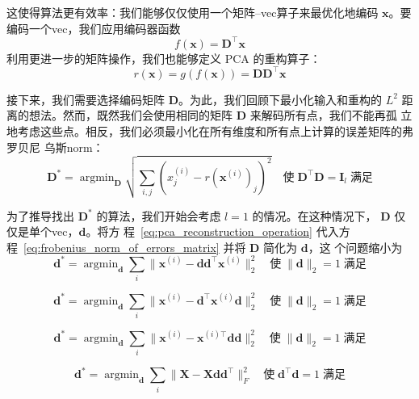 这使得算法更有效率：我们能够仅仅使用一个矩阵--\gls*{vec}算子来最优化地编码
$\pmb{x}$。要编码一个\gls*{vec}，我们应用编码器函数
\begin{equation}
  f(\pmb{x}) = \pmb{D}^{\top}\pmb{x}
\end{equation}
利用更进一步的矩阵操作，我们也能够定义 PCA 的重构算子：
\begin{equation}
  r(\pmb{x}) = g(f(\pmb{x})) = \pmb{D}\pmb{D}^{\top}\pmb{x}
  \label{eq:pca_reconstruction_operation}
\end{equation}

接下来，我们需要选择编码矩阵 $\pmb{D}$。为此，我们回顾下最小化输入和重构的 $L^2$
距离的想法。然而，既然我们会使用相同的矩阵 $\pmb{D}$ 来解码所有点，我们不能再孤
立地考虑这些点。相反，我们必须最小化在所有维度和所有点上计算的误差矩阵的弗罗贝尼
乌斯\gls*{norm}：
\begin{equation}
  \pmb{D}^* = \mathop{\arg\min}_{\pmb{D}}\sqrt{\sum_{i,j}(x^{(i)}_j -
    r(\pmb{x}^{(i)})_j)^2}\quad\text{使}\;\pmb{D}^{\top}\pmb{D} =
  \pmb{I}_l\;\text{满足}
  \label{eq:frobenius_norm_of_errors_matrix}
\end{equation}

为了推导找出 $\pmb{D}^*$ 的算法，我们开始会考虑 $l = 1$ 的情况。在这种情况下，
$\pmb{D}$ 仅仅是单个\gls*{vec}，$\pmb{d}$。将方
程~\ref{eq:pca_reconstruction_operation} 代入方
程~\ref{eq:frobenius_norm_of_errors_matrix} 并将 $\pmb{D}$ 简化为 $\pmb{d}$，这
个问题缩小为
\begin{equation}
  \pmb{d}^* = \mathop{\arg\min}_{\pmb{d}}\sum_i\|\pmb{x}^{(i)} -
  \pmb{d}\pmb{d}^{\top}\pmb{x}^{(i)}\|^2_2\quad\text{使}\;\|\pmb{d}\|_2 =
  1\;\text{满足}
\end{equation}

\begin{equation}
  \pmb{d}^* = \mathop{\arg\min}_{\pmb{d}}\sum_i\|\pmb{x}^{(i)} -
  \pmb{d}^{\top}\pmb{x}^{(i)}\pmb{d}\|^2_2\quad\text{使}\;\|\pmb{d}\|_2 =
  1\;\text{满足}
\end{equation}

\begin{equation}
  \pmb{d}^* = \mathop{\arg\min}_{\pmb{d}}\sum_i\|\pmb{x}^{(i)} -
  \pmb{x}^{(i)\top}\pmb{d}\pmb{d}\|^2_2\quad\text{使}\;\|\pmb{d}\|_2 =
  1\;\text{满足}
\end{equation}

\begin{equation}
  \pmb{d}^* = \mathop{\arg\min}_{\pmb{d}}\sum_i\|\pmb{X} -
  \pmb{X}\pmb{d}\pmb{d}^{\top}\|^2_F\quad\text{使}\;\pmb{d}^{\top}\pmb{d} =
  1\;\text{满足}
\end{equation}

